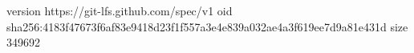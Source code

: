 version https://git-lfs.github.com/spec/v1
oid sha256:4183f47673f6af83e9418d23f1f557a3e4e839a032ae4a3f619ee7d9a81e431d
size 349692
